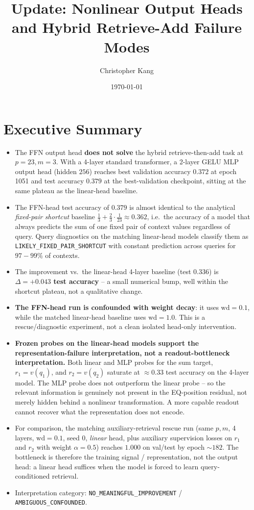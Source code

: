 \documentclass[10pt]{article}
\title{Update: Nonlinear Output Heads and Hybrid Retrieve-Add Failure Modes}
\author{Christopher Kang}
\date{\today}
\begin{document}
\maketitle

\section{Executive Summary}

\begin{itemize}
\item The FFN output head \textbf{does not solve} the hybrid retrieve-then-add task at $p=23, m=3$. With a 4-layer standard transformer, a 2-layer GELU MLP output head (hidden $256$) reaches best validation accuracy $0.372$ at epoch 1051 and test accuracy $0.379$ at the best-validation checkpoint, sitting at the same plateau as the linear-head baseline.
\item The FFN-head test accuracy of $0.379$ is almost identical to the analytical \emph{fixed-pair shortcut} baseline $\frac{1}{3}+\frac{2}{3}\cdot\frac{1}{23}\approx 0.362$, i.e.\ the accuracy of a model that always predicts the sum of one fixed pair of context values regardless of query. Query diagnostics on the matching linear-head models classify them as \texttt{LIKELY\_FIXED\_PAIR\_SHORTCUT} with constant prediction across queries for $97{-}99\%$ of contexts.
\item The improvement vs.\ the linear-head 4-layer baseline (test $0.336$) is \textbf{$\Delta = +0.043$ test accuracy} -- a small numerical bump, well within the shortcut plateau, not a qualitative change.
\item \textbf{The FFN-head run is confounded with weight decay}: it uses $\mathrm{wd}=0.1$, while the matched linear-head baseline uses $\mathrm{wd}=1.0$. This is a rescue/diagnostic experiment, not a clean isolated head-only intervention.
\item \textbf{Frozen probes on the linear-head models support the representation-failure interpretation, not a readout-bottleneck interpretation.} Both linear and MLP probes for the sum target, $r_1=v(q_1)$, and $r_2=v(q_2)$ saturate at $\approx 0.33$ test accuracy on the 4-layer model. The MLP probe does not outperform the linear probe -- so the relevant information is genuinely not present in the EQ-position residual, not merely hidden behind a nonlinear transformation. A more capable readout cannot recover what the representation does not encode.
\item For comparison, the matching auxiliary-retrieval rescue run (same $p, m$, 4 layers, $\mathrm{wd}=0.1$, seed 0, \emph{linear} head, plus auxiliary supervision losses on $r_1$ and $r_2$ with weight $\alpha=0.5$) reaches $1.000$ on val/test by epoch $\sim 182$. The bottleneck is therefore the training signal / representation, not the output head: a linear head suffices when the model is forced to learn query-conditioned retrieval.
\item Interpretation category: \texttt{NO\_MEANINGFUL\_IMPROVEMENT} / \texttt{AMBIGUOUS\_CONFOUNDED}.
\end{itemize}
\end{document}
